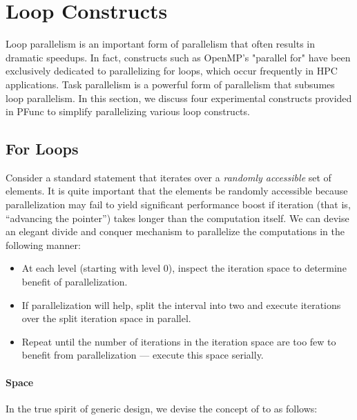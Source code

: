 \section{Loop Constructs}
\label{sec:loops}

Loop parallelism is an important form of parallelism that often results in
dramatic speedups. 
%
In fact, constructs such as OpenMP's "parallel for" have been exclusively
dedicated to parallelizing for loops, which occur frequently in HPC
applications.
%
Task parallelism is a powerful form of parallelism that subsumes loop
parallelism. 
%
In this section, we discuss four experimental constructs provided in PFunc 
to simplify parallelizing various loop constructs.
%

\subsection{For Loops}
\label{subsec:for}
Consider a standard  statement that iterates over a \textit{randomly
accessible} set of elements. 
%
It is quite important that the elements be randomly accessible because
parallelization may fail to yield significant performance boost if iteration
(that is, ``advancing the pointer'') takes longer than the computation itself.
%
We can devise an elegant divide and conquer mechanism to parallelize the 
computations in the following manner:

\begin{itemize}
\item At each level (starting with level 0), inspect the iteration space to
determine benefit of parallelization.
\item If parallelization will help, split the interval into two and execute
iterations over the split iteration space in parallel.
\item Repeat until the number of iterations in the iteration space are too few
to benefit from parallelization --- execute this space serially.
\end{itemize}

\paragraph{Space} In the true spirit of generic design, we devise the concept
of  to as follows:


